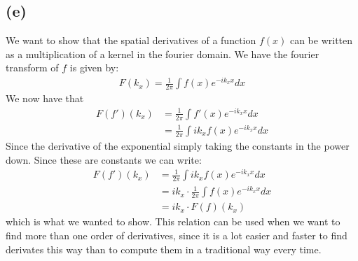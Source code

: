 \documentclass[a4paper]{article}
\begin{document}
\subsection{(e)}
We want to show that the spatial derivatives of a function $f(x)$ can be written as a multiplication of a kernel in the fourier domain. We have the fourier transform of $f$ is given by:
\begin{align*}
  F(k_x)=\frac{1}{2\pi}\int f(x)e^{-ik_xx}dx
\end{align*}
We now have that
\begin{align*}
  F(f')(k_x)&= \frac{1}{2\pi}\int f'(x)e^{-ik_xx}dx \\
        &= \frac{1}{2\pi}\int ik_xf(x)e^{-ik_xx}dx
\end{align*}
Since the derivative of the exponential simply taking the constants in the power down. Since these are constants we can write:
\begin{align*}
  F(f')(k_x) &= \frac{1}{2\pi}\int ik_xf(x)e^{-ik_xx}dx \\
         &= ik_x\cdot \frac{1}{2\pi}\int f(x)e^{-ik_xx}dx \\
         &= ik_x\cdot F(f)(k_x)
\end{align*}
which is what we wanted to show. This relation can be used when we want to find more than one order of derivatives, since it is a lot easier and faster to find derivates this way than to compute them in a traditional way every time.
\end{document}
